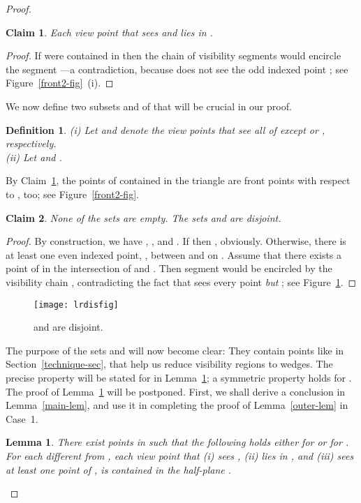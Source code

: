 \documentclass[11pt]{article}
\newtheorem{definition}{Definition}
\newtheorem{lemma}{Lemma}
\newtheorem{claim}{Claim}
\begin{document}
\begin{proof}
\begin{claim}         \label{newfront-claim}
Each view point  that sees  and  lies in .
\end{claim}
\begin{proof}
If  were contained in  then the chain of visibility segments 
 would encircle the segment ---a contradiction,
because  does not see the odd indexed point ; see  Figure~\ref{front2-fig}~(i).
\end{proof}


We now define two subsets  and  of  that will be crucial in our proof.
\begin{definition}    \label{lr-defi}
(i) Let  and 
denote the view points that see all of  except  or , respectively.\\
(ii) Let  and .
\end{definition}
By Claim~\ref{newfront-claim}, the points of  contained in the triangle  are front points with respect
to , too; see Figure~\ref{front2-fig}.
\begin{claim}         \label{lr-claim}
None of the sets  are empty. The sets  and  are disjoint. 
\end{claim}
\begin{proof}
By construction, we have , , and .
If  then , obviously. Otherwise, there is at least one
even indexed point, , between  and  on . Assume 
that there exists a point  of  in the intersection of  and . Then segment
 would be encircled by the visibility chain , 
contradicting the fact that  sees every point {\em but} ; see Figure~\ref{lrdis-fig}. 
\end{proof}
\begin{figure}[hbtp]\begin{center}\texttt{[image: lrdisfig]}\caption{ and  are disjoint.}\label{lrdis-fig}
  \end{center}\end{figure}


The purpose of the sets  and  will now become clear: They contain points 
like  in Section~\ref{technique-sec}, that help us reduce visibility regions
to wedges. The precise property will be stated for  in Lemma~\ref{case-lem};
a symmetric property holds for . The proof of Lemma~\ref{case-lem} will be 
postponed. First, we shall derive a conclusion in Lemma~\ref{main-lem},
and use it in completing the proof of Lemma~\ref{outer-lem} in Case~1.


\begin{lemma}      \label{case-lem}
There exist points  in  such that the following holds either for  
or for .
For each  different from , 
each view point that (i) sees , (ii) lies in , and (iii) sees at least one point of , 
is contained in the half-plane .
\end{lemma}


\end{proof}
\end{document}
